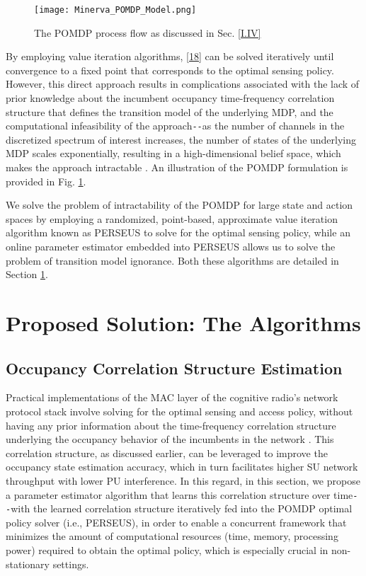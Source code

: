 \documentclass[12pt, draftcls, onecolumn]{IEEEtran}
\begin{document}
\begin{figure} [htb]
    \centerline{
    \texttt{[image: Minerva\_POMDP\_Model.png]}}
    \caption{The POMDP process flow as discussed in Sec. \ref{I.IV}}
    \label{fig: A.add-1}
\end{figure}
By employing value iteration algorithms, \eqref{18} can be solved iteratively until convergence to a fixed point that corresponds to the optimal sensing policy. However, this direct approach results in complications associated with the lack of prior knowledge about the incumbent occupancy time-frequency correlation structure that defines the transition model of the underlying MDP, and the computational infeasibility of the approach\texttt{-{}-}as the number of channels in the discretized spectrum of interest increases, the number of states of the underlying MDP scales exponentially, resulting in a high-dimensional belief space, which makes the approach intractable \cite{WCL:paper}. An illustration of the POMDP formulation is provided in Fig. \ref{fig: A.add-1}.

We solve the problem of intractability of the POMDP for large state and action spaces by employing a randomized, point-based, approximate value iteration algorithm known as PERSEUS \cite{WCL:13} to solve for the optimal sensing policy, while an online parameter estimator embedded into PERSEUS allows us to solve the problem of transition model ignorance. Both these algorithms are detailed in Section \ref{II}.
\section{Proposed Solution: The Algorithms}\label{II}
\subsection{Occupancy Correlation Structure Estimation}\label{II.I}
Practical implementations of the MAC layer of the cognitive radio's network protocol stack involve solving for the optimal sensing and access policy, without having any prior information about the time-frequency correlation structure underlying the occupancy behavior of the incumbents in the network \cite{WCL:paper}. This correlation structure, as discussed earlier, can be leveraged to improve the occupancy state estimation accuracy, which in turn facilitates higher SU network throughput with lower PU interference. In this regard, in this section, we propose a parameter estimator algorithm that learns this correlation structure over time\texttt{-{}-}with the learned correlation structure iteratively fed into the POMDP optimal policy solver (i.e., PERSEUS), in order to enable a concurrent framework that minimizes the amount of computational resources (time, memory, processing power) required to obtain the optimal policy, which is especially crucial in non-stationary settings.
\end{document}
